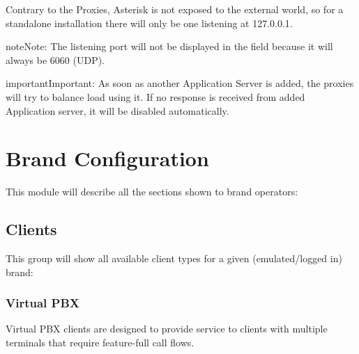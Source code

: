 \documentclass[letterpaper,10pt,english]{sphinxmanual}
\begin{document}
Contrary to the Proxies, Asterisk is not exposed to the external world, so
for a standalone installation there will only be one listening at 127.0.0.1.

\begin{notice}{note}{Note:}
The listening port will not be displayed in the field because it will
always be 6060 (UDP).
\end{notice}

\begin{notice}{important}{Important:}
As soon as another Application Server is added, the proxies will
try to balance load using it. If no response is received from added
Application server, it will be disabled automatically.
\end{notice}


\chapter{Brand Configuration}
\label{administration_portal/brand/index::doc}\label{administration_portal/brand/index:brand-configuration}
This module will describe all the sections shown to brand operators:


\section{Clients}
\label{administration_portal/brand/clients/index:clients}\label{administration_portal/brand/clients/index::doc}
This group will show all available client types for a given (emulated/logged in) brand:


\subsection{Virtual PBX}
\label{administration_portal/brand/clients/virtual_pbx::doc}\label{administration_portal/brand/clients/virtual_pbx:virtual-pbx}
Virtual PBX clients are designed to provide service to clients with multiple terminals
that require feature-full call flows.
\end{document}
